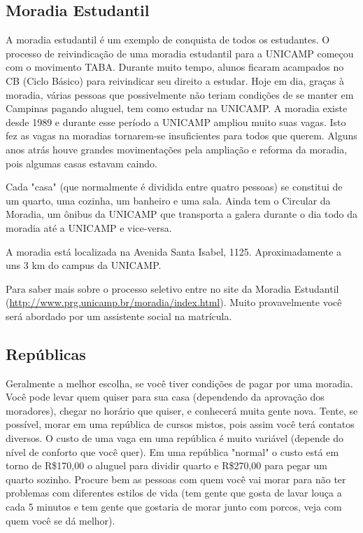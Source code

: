 \documentclass[a4paper,10pt, twocolumn]{article}
\begin{document}
\subsection{Moradia Estudantil}
A moradia estudantil é um exemplo de conquista de todos os estudantes.
O processo de reivindicação de uma moradia estudantil para a UNICAMP começou com
o movimento TABA. Durante muito tempo, alunos ficaram acampados no CB (Ciclo
Básico) para reivindicar seu direito a estudar. Hoje em dia, graças à moradia,
várias pessoas que possivelmente não teriam condições de se manter em Campinas
pagando aluguel, tem como estudar na UNICAMP. A moradia existe desde 1989
e durante esse período a UNICAMP ampliou muito suas vagas. Isto fez as vagas na
moradias tornarem-se insuficientes para todos que querem. Alguns anos atrás
houve grandes movimentações pela ampliação e reforma da moradia, pois algumas
casas estavam caindo.

Cada "casa" (que normalmente é dividida entre quatro pessoas) se constitui de um
quarto, uma cozinha, um banheiro e uma sala. Ainda tem o Circular da Moradia, um
ônibus da UNICAMP que transporta a galera durante o dia todo da moradia até
a UNICAMP e vice-versa.

A moradia está localizada na Avenida Santa Isabel, 1125. Aproximadamente a uns
3 km do campus da UNICAMP.

Para saber mais sobre o processo seletivo entre no site da Moradia Estudantil
(\url{http://www.prg.unicamp.br/moradia/index.html}). Muito provavelmente você
será abordado por um assistente social na matrícula.

\subsection{Repúblicas}
Geralmente a melhor escolha, se você tiver condições de pagar por uma moradia.
Você pode levar quem quiser para sua casa (dependendo da aprovação dos
moradores), chegar no horário que quiser, e conhecerá muita gente nova. Tente,
se possível, morar em uma república de cursos mistos, pois assim você terá
contatos diversos. O custo de uma vaga em uma república é muito variável
(depende do nível de conforto que você quer). Em uma república "normal" o custo
está em torno de R\$170,00 o aluguel para dividir quarto e R\$270,00 para pegar
um quarto sozinho. Procure bem as pessoas com quem você vai morar para não ter
problemas com diferentes estilos de vida (tem gente que gosta de lavar louça
a cada 5 minutos e tem gente que gostaria de morar junto com porcos, veja com
quem você se dá melhor).
\end{document}
